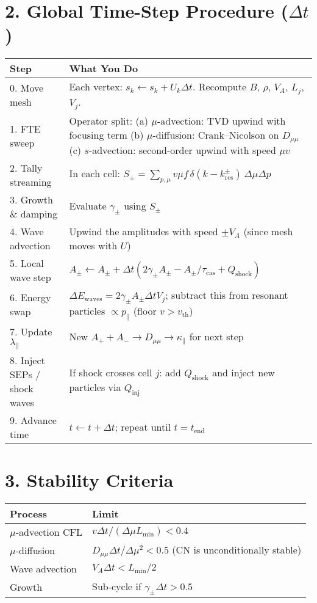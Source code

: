 \section*{2. Global Time-Step Procedure ($\Delta t$)}

\begin{center}
\renewcommand{\arraystretch}{1.4}
\begin{tabular}{@{}p{} | p{}@{}}
\toprule
\textbf{Step} & \textbf{What You Do} \\
\midrule
0. Move mesh &
Each vertex: $s_k \leftarrow s_k + U_k \Delta t$. Recompute $B$, $\rho$, $V_A$, $L_j$, $V_j$. \\
1. FTE sweep &
Operator split:  
(a) $\mu$-advection: TVD upwind with focusing term  
(b) $\mu$-diffusion: Crank–Nicolson on $D_{\mu\mu}$  
(c) $s$-advection: second-order upwind with speed $\mu v$ \\
2. Tally streaming &
In each cell: $S_\pm = \sum_{p,\mu} v \mu f\, \delta(k - k_{\text{res}}^\pm)\, \Delta \mu \Delta p$ \\
3. Growth \& damping &
Evaluate $\gamma_\pm$ using $S_\pm$ \\
4. Wave advection &
Upwind the amplitudes with speed $\pm V_A$ (since mesh moves with $U$) \\
5. Local wave step &
$A_\pm \leftarrow A_\pm + \Delta t \left( 2\gamma_\pm A_\pm - A_\pm/\tau_{\text{cas}} + Q_{\text{shock}} \right)$ \\
6. Energy swap &
$\Delta E_{\text{waves}} = 2\gamma_\pm A_\pm \Delta t V_j$; subtract this from resonant particles $\propto p_\parallel$ (floor $v > v_{\text{th}}$) \\
7. Update $\lambda_\parallel$ &
New $A_+ + A_- \rightarrow D_{\mu\mu} \rightarrow \kappa_\parallel$ for next step \\
8. Inject SEPs / shock waves &
If shock crosses cell $j$: add $Q_{\text{shock}}$ and inject new particles via $Q_{\text{inj}}$ \\
9. Advance time &
$t \leftarrow t + \Delta t$; repeat until $t = t_{\text{end}}$ \\
\bottomrule
\end{tabular}
\end{center}

\section*{3. Stability Criteria}

\begin{center}
\begin{tabular}{@{}l | l@{}}
\toprule
\textbf{Process} & \textbf{Limit} \\
\midrule
$\mu$-advection CFL & $v \Delta t / (\Delta \mu L_{\min}) < 0.4$ \\
$\mu$-diffusion & $D_{\mu\mu} \Delta t / \Delta \mu^2 < 0.5$ (CN is unconditionally stable) \\
Wave advection & $V_A \Delta t < L_{\min} / 2$ \\
Growth & Sub-cycle if $\gamma_\pm \Delta t > 0.5$ \\
\bottomrule
\end{tabular}
\end{center}

